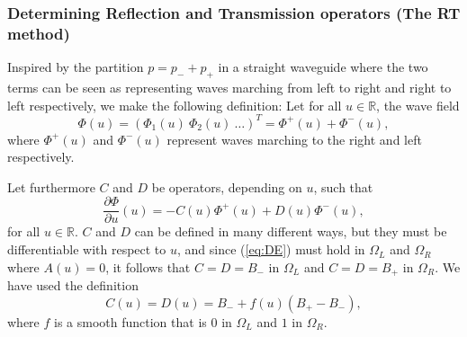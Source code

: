 \documentclass{kluwer}
\renewcommand{\Phi}{\varPhi}
\renewcommand{\vec}[1]{\bm{#1}}
\newcommand{\R}{\mathbb R}
\renewcommand{\Phi}{\varPhi}
\begin{document}
\begin{article}
\subsubsection{Determining Reflection and Transmission operators (The
  RT method)}
\label{sec:RT}



Inspired by the partition $p=p_-+p_+$ in a straight waveguide
where the two terms can be seen as representing waves marching from
left to right and right to left respectively, we make the following
definition: Let for all $u\in\R$, the wave field 
\begin{equation}
  \label{eq:Phipart1}
  \vec\Phi(u)=(\Phi_1(u)\ \Phi_2(u)\ \dots)^T
  =\vec\Phi^+(u)+\vec\Phi^-(u), 
\end{equation}
where $\vec\Phi^+(u)$ and $\vec\Phi^-(u)$ represent waves marching to
the right and left respectively.

Let furthermore $C$ and $D$ be operators, depending on $u$, such that
\begin{equation}
  \label{eq:plusminustodiff}
    \dfrac{\partial\vec\Phi}{\partial u}(u)=
    -C(u)\vec\Phi^+(u)+D(u)\vec\Phi^-(u),
\end{equation}
for all $u\in\R$. $C$ and $D$ can be defined in many different ways,
but they must be differentiable with respect to $u$, and since
(\ref{eq:DE}) must hold in $\Omega_L$ and $\Omega_R$ where $A(u)=0$,
it follows that $C=D=B_-$ in $\Omega_L$ and $C=D=B_+$ in
$\Omega_R$. We have used the definition
\begin{equation}
  \label{eq:CD}
  C(u)=D(u)=B_-+f(u)(B_+-B_-),
\end{equation}
where $f$ is a smooth function that is $0$ in $\Omega_L$ and $1$ in
$\Omega_R$. 


\end{article}
\end{document}
